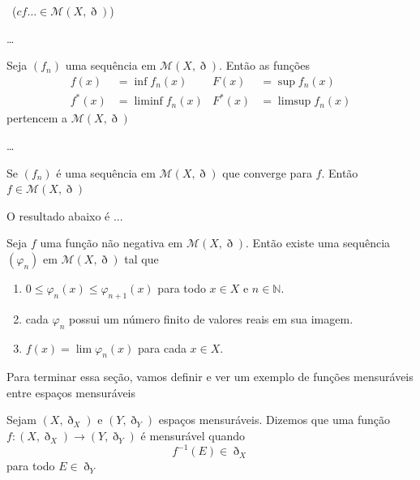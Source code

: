 \documentclass[a4paper, 11pt]{book}
\theoremstyle{definition}
\newcommand{\obs}{\noindent{\textbf{\textcolor{black}{\sffamily Observação:}}}~}
\newcommand{\bN}{\mathbb{N}}
\newcommand{\cM}{\mathcal{M}}
\begin{document}
\obs ($cf\dots \in \cM(X,\eth)$)

\dots

\begin{lbox}
    Seja $(f_n)$ uma sequência em $\cM(X,\eth)$. Então as funções
    \[
        \begin{aligned}
            f(x) &= \inf f_n(x) & F(x) &= \sup f_n(x)\\
            f^*(x) &=\liminf f_n(x) & F^*(x) &= \limsup f_n(x) 
        \end{aligned}
    \]
    pertencem a $\cM(X,\eth)$
\end{lbox}
\begin{prf}
    
\end{prf}

\dots

\begin{cbox}
    Se $(f_n)$ é uma sequência em $\cM(X,\eth)$ que converge para $f$.
    Então $f \in \cM(X,\eth)$
\end{cbox}
\begin{prf}
    
\end{prf}

O resultado abaixo é ...

\begin{pbox}
    Seja $f$ uma função não negativa em $\cM(X,\eth)$.
    Então existe uma sequência $(\varphi_n)$ em $\cM(X,\eth)$ tal que
    \begin{enumerate}[leftmargin=*, label=\textbf{(\alph*)}]
        \item $0 \leqslant \varphi_n(x) \leqslant \varphi_{n+1}(x)$ para todo $x \in X$ e $n \in \bN$.
        \item cada $\varphi_n$ possui um número finito de valores reais em sua imagem.
        \item $f(x) = \lim \varphi_n(x)$ para cada $x \in X$.
    \end{enumerate}
\end{pbox}
\begin{prf}
    
\end{prf}

Para terminar essa seção, vamos definir e ver um exemplo de funções mensuráveis entre espaços mensuráveis

\begin{dbox}
    Sejam $(X,\eth_X)$ e $(Y, \eth_Y)$ espaços mensuráveis. Dizemos que uma função $f : (X,\eth_X) \to (Y, \eth_Y)$ é mensurável quando
    \[
        f^{-1}(E) \in \eth_X
    \]
    para todo $E \in \eth_Y$
\end{dbox}
\end{document}

